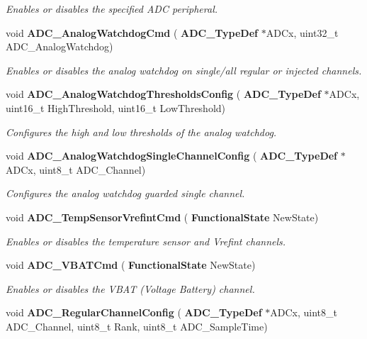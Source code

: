 \begin{DoxyCompactItemize}
\begin{DoxyCompactList}\small\item\em Enables or disables the specified A\+DC peripheral. \end{DoxyCompactList}\item 
void \textbf{ A\+D\+C\+\_\+\+Analog\+Watchdog\+Cmd} (\textbf{ A\+D\+C\+\_\+\+Type\+Def} $\ast$A\+D\+Cx, uint32\+\_\+t A\+D\+C\+\_\+\+Analog\+Watchdog)
\begin{DoxyCompactList}\small\item\em Enables or disables the analog watchdog on single/all regular or injected channels. \end{DoxyCompactList}\item 
void \textbf{ A\+D\+C\+\_\+\+Analog\+Watchdog\+Thresholds\+Config} (\textbf{ A\+D\+C\+\_\+\+Type\+Def} $\ast$A\+D\+Cx, uint16\+\_\+t High\+Threshold, uint16\+\_\+t Low\+Threshold)
\begin{DoxyCompactList}\small\item\em Configures the high and low thresholds of the analog watchdog. \end{DoxyCompactList}\item 
void \textbf{ A\+D\+C\+\_\+\+Analog\+Watchdog\+Single\+Channel\+Config} (\textbf{ A\+D\+C\+\_\+\+Type\+Def} $\ast$A\+D\+Cx, uint8\+\_\+t A\+D\+C\+\_\+\+Channel)
\begin{DoxyCompactList}\small\item\em Configures the analog watchdog guarded single channel. \end{DoxyCompactList}\item 
void \textbf{ A\+D\+C\+\_\+\+Temp\+Sensor\+Vrefint\+Cmd} (\textbf{ Functional\+State} New\+State)
\begin{DoxyCompactList}\small\item\em Enables or disables the temperature sensor and Vrefint channels. \end{DoxyCompactList}\item 
void \textbf{ A\+D\+C\+\_\+\+V\+B\+A\+T\+Cmd} (\textbf{ Functional\+State} New\+State)
\begin{DoxyCompactList}\small\item\em Enables or disables the V\+B\+AT (Voltage Battery) channel. \end{DoxyCompactList}\item 
void \textbf{ A\+D\+C\+\_\+\+Regular\+Channel\+Config} (\textbf{ A\+D\+C\+\_\+\+Type\+Def} $\ast$A\+D\+Cx, uint8\+\_\+t A\+D\+C\+\_\+\+Channel, uint8\+\_\+t Rank, uint8\+\_\+t A\+D\+C\+\_\+\+Sample\+Time)

\end{DoxyCompactItemize}

